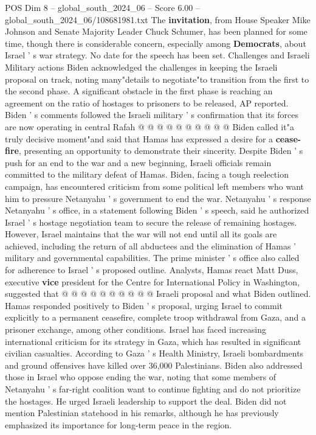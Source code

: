 \begin{textsample}{POS Dim 8 – global\_south\_2024\_06 – Score 6.00 – global\_south\_2024\_06/108681981.txt}
The \textbf{invitation}, from House Speaker Mike Johnson and Senate Majority Leader Chuck Schumer, has been planned for some time, though there is considerable concern, especially among \textbf{Democrats}, about Israel ' s war strategy.
No date for the speech has been set.
Challenges and Israeli Military actions Biden acknowledged the challenges in keeping the Israeli proposal on track, noting many"details to negotiate"to transition from the first to the second phase.
A significant obstacle in the first phase is reaching an agreement on the ratio of hostages to prisoners to be released, AP reported.
Biden ' s comments followed the Israeli military ' s confirmation that its forces are now operating in central Rafah @ @ @ @ @ @ @ @ @ @ Biden called it"a truly decisive moment"and said that Hamas has expressed a desire for a \textbf{cease-fire}, presenting an opportunity to demonstrate their sincerity.
Despite Biden ' s push for an end to the war and a new beginning, Israeli officials remain committed to the military defeat of Hamas.
Biden, facing a tough reelection campaign, has encountered criticism from some political left members who want him to pressure Netanyahu ' s government to end the war.
Netanyahu ' s response Netanyahu ' s office, in a statement following Biden ' s speech, said he authorized Israel ' s hostage negotiation team to secure the release of remaining hostages.
However, Israel maintains that the war will not end until all its goals are achieved, including the return of all abductees and the elimination of Hamas ' military and governmental capabilities.
The prime minister ' s office also called for adherence to Israel ' s proposed outline.
Analysts, Hamas react Matt Duss, executive \textbf{vice} president for the Centre for International Policy in Washington, suggested that @ @ @ @ @ @ @ @ @ @ Israeli proposal and what Biden outlined.
Hamas responded positively to Biden ' s proposal, urging Israel to commit explicitly to a permanent ceasefire, complete troop withdrawal from Gaza, and a prisoner exchange, among other conditions.
Israel has faced increasing international criticism for its strategy in Gaza, which has resulted in significant civilian casualties.
According to Gaza ' s Health Ministry, Israeli bombardments and ground offensives have killed over 36,000 Palestinians.
Biden also addressed those in Israel who oppose ending the war, noting that some members of Netanyahu ' s far-right coalition want to continue fighting and do not prioritize the hostages.
He urged Israeli leadership to support the deal.
Biden did not mention Palestinian statehood in his remarks, although he has previously emphasized its importance for long-term peace in the region.

\end{textsample}

